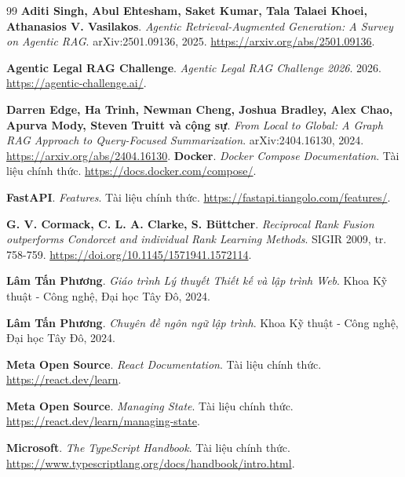 \documentclass[12pt,a4paper,oneside]{report}
\begin{document}
\clearpage
\begin{thebibliography}{99}
  \textbf{Aditi Singh, Abul Ehtesham, Saket Kumar, Tala Talaei Khoei, Athanasios V. Vasilakos}. \textit{Agentic Retrieval-Augmented Generation: A Survey on Agentic RAG}. arXiv:2501.09136, 2025. \url{https://arxiv.org/abs/2501.09136}.

  \textbf{Agentic Legal RAG Challenge}. \textit{Agentic Legal RAG Challenge 2026}. 2026. \url{https://agentic-challenge.ai/}.

  \textbf{Darren Edge, Ha Trinh, Newman Cheng, Joshua Bradley, Alex Chao, Apurva Mody, Steven Truitt và cộng sự}. \textit{From Local to Global: A Graph RAG Approach to Query-Focused Summarization}. arXiv:2404.16130, 2024. \url{https://arxiv.org/abs/2404.16130}.
  \textbf{Docker}. \textit{Docker Compose Documentation}. Tài liệu chính thức. \url{https://docs.docker.com/compose/}.

  \textbf{FastAPI}. \textit{Features}. Tài liệu chính thức. \url{https://fastapi.tiangolo.com/features/}.

  \textbf{G. V. Cormack, C. L. A. Clarke, S. Büttcher}. \textit{Reciprocal Rank Fusion outperforms Condorcet and individual Rank Learning Methods}. SIGIR 2009, tr. 758-759. \url{https://doi.org/10.1145/1571941.1572114}.

  \textbf{Lâm Tấn Phương}. \textit{Giáo trình Lý thuyết Thiết kế và lập trình Web}. Khoa Kỹ thuật - Công nghệ, Đại học Tây Đô, 2024.

  \textbf{Lâm Tấn Phương}. \textit{Chuyên đề ngôn ngữ lập trình}. Khoa Kỹ thuật - Công nghệ, Đại học Tây Đô, 2024.

  \textbf{Meta Open Source}. \textit{React Documentation}. Tài liệu chính thức. \url{https://react.dev/learn}.

  \textbf{Meta Open Source}. \textit{Managing State}. Tài liệu chính thức. \url{https://react.dev/learn/managing-state}.

  \textbf{Microsoft}. \textit{The TypeScript Handbook}. Tài liệu chính thức. \url{https://www.typescriptlang.org/docs/handbook/intro.html}.


\end{thebibliography}
\end{document}
